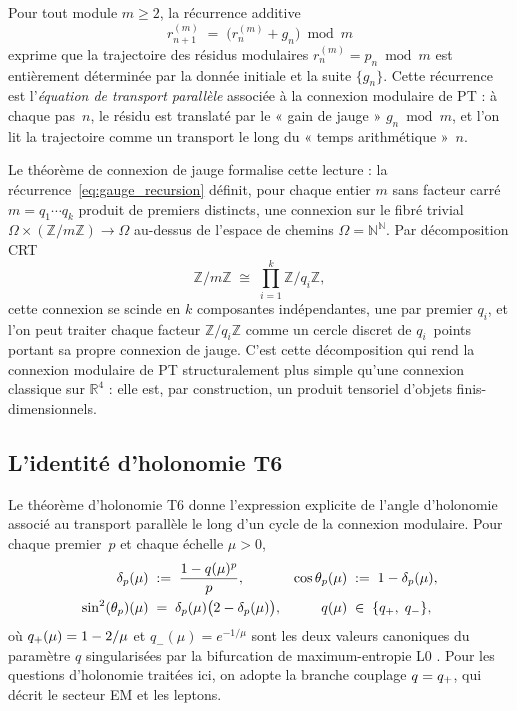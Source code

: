 Pour tout module $m \geq 2$, la récurrence additive
\begin{equation}
  r_{n+1}^{(m)} \;=\; \bigl(r_n^{(m)} + g_n\bigr) \bmod m
  \label{eq:gauge_recursion}
\end{equation}
exprime que la trajectoire des résidus modulaires
$r_n^{(m)} = p_n \bmod m$ est entièrement déterminée par la
donnée initiale et la suite $\{g_n\}$. Cette récurrence est
l'\emph{équation de transport parallèle} associée à la connexion
modulaire de PT : à chaque pas~$n$, le résidu est translaté par
le « gain de jauge » $g_n \bmod m$, et l'on lit la trajectoire
comme un transport le long du « temps arithmétique »~$n$.

Le théorème de connexion de jauge \cite[ch.~1, Thm.~gauge]{PT_Monograph}
formalise cette lecture : la récurrence~\eqref{eq:gauge_recursion}
définit, pour chaque entier $m$ sans facteur carré
$m = q_1 \cdots q_k$ produit de premiers distincts, une connexion
sur le fibré trivial
$\Omega \times (\mathbb{Z}/m\mathbb{Z}) \to \Omega$ au-dessus de
l'espace de chemins $\Omega = \mathbb{N}^{\mathbb{N}}$. Par
décomposition CRT
\begin{equation}
  \mathbb{Z}/m\mathbb{Z}
  \;\cong\;
  \prod_{i=1}^{k} \mathbb{Z}/q_i\mathbb{Z},
  \label{eq:CRT_iso_fr}
\end{equation}
cette connexion se scinde en $k$ composantes indépendantes, une
par premier $q_i$, et l'on peut traiter chaque facteur
$\mathbb{Z}/q_i\mathbb{Z}$ comme un cercle discret de
$q_i$~points portant sa propre connexion de jauge. C'est cette
décomposition qui rend la connexion modulaire de PT structuralement
plus simple qu'une connexion classique sur $\mathbb{R}^4$ : elle
est, par construction, un produit tensoriel d'objets
finis-dimensionnels.

\subsection{L'identité d'holonomie T6}
\label{ssec:T6_holonomie}

Le théorème d'holonomie T6 \cite[ch.~6]{PT_Monograph} donne
l'expression explicite de l'angle d'holonomie associé au transport
parallèle le long d'un cycle de la connexion modulaire. Pour
chaque premier~$p$ et chaque échelle $\mu > 0$,
\begin{align}
  \delta_p(\mu) &\;:=\; \frac{1 - q(\mu)^p}{p},
  &
  \cos \theta_p(\mu) &\;:=\; 1 - \delta_p(\mu),
  \label{eq:delta_theta_fr}
\\
  \sin^2(\theta_{p})(\mu) &\;=\; \delta_p(\mu)\bigl(2 - \delta_p(\mu)\bigr),
  &
  q(\mu) &\;\in\; \{q_{+},\; q_-\},
  \label{eq:sin2_theta_fr}
\end{align}
où $q_{+}(\mu) = 1 - 2/\mu$ et $q_-(\mu) = e^{-1/\mu}$ sont les
deux valeurs canoniques du paramètre $q$ singularisées par la
bifurcation de maximum-entropie L0 \cite[ch.~3]{PT_Monograph}. Pour
les questions d'holonomie traitées ici, on adopte la branche
couplage $q = q_{+}$, qui décrit le secteur EM et les leptons.

